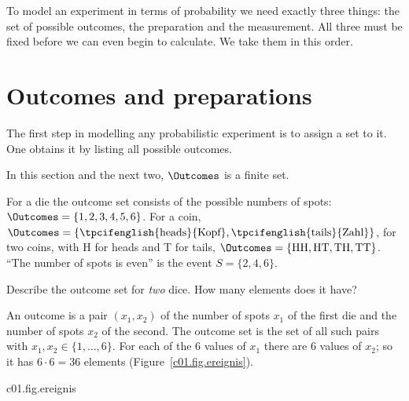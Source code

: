 To model an experiment in terms of probability we need exactly three things: the set of
possible outcomes, the preparation and the measurement. All three must be fixed before we
can even begin to calculate. We take them in this order.

\section{Outcomes and preparations}\label{c01.s1}

The first step in modelling any probabilistic experiment is to assign a set to it. One
obtains it by listing all possible outcomes.


In this section and the next two, $\Outcomes$ is a finite set.

\begin{example}\label{c01.ex.wuerfel}
  For a die the outcome set consists of the possible numbers of spots:
  $\Outcomes = \{1, 2, 3, 4, 5, 6\}$. For a coin,
  $\Outcomes = \{\text{\tpcifenglish{heads}{Kopf}}, \text{\tpcifenglish{tails}{Zahl}}\}$,
  for two coins, with H for heads and T for tails,
  $\Outcomes = \{\text{HH}, \text{HT}, \text{TH}, \text{TT}\}$. “The number of spots is
  even” is the event $S = \{2, 4, 6\}$.
\end{example}

\begin{exercise}\label{c01.exc.zwei-wuerfel}
  Describe the outcome set for \emph{two} dice. How many elements does it have?
\end{exercise}
\begin{solution}
  An outcome is a pair $(x_1, x_2)$ of the number of spots $x_1$ of the first die and the
  number of spots $x_2$ of the second. The outcome set is the set of all such pairs with
  $x_1, x_2 \in \{1, \dots, 6\}$. For each of the $6$ values of $x_1$ there are $6$ values
  of $x_2$; so it has $6 \cdot 6 = 36$ elements
  (Figure~\ref{c01.fig.ereignis}).
\end{solution}

\begin{tpcfigure}{c01.fig.ereignis}
  \caption{Outcome sets and events. (a) One die: six outcomes; the event “even number of
    spots” is the set of hatched cells. (b) Two dice: every point is a pair $(x_1, x_2)$,
    $36$ outcomes in all. The event “the sum of the spots is $7$” consists of the six
    pairs marked by squares.}
\end{tpcfigure}

